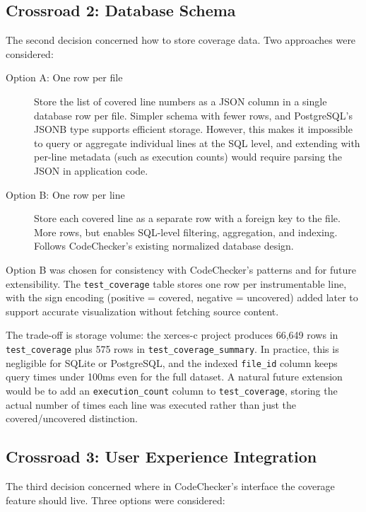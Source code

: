 \subsection{Crossroad 2: Database Schema}

The second decision concerned how to store coverage data. Two approaches were considered:

\begin{description}
    \item[Option A: One row per file] Store the list of covered line numbers as a JSON column in a single database row per file. Simpler schema with fewer rows, and PostgreSQL's JSONB type supports efficient storage. However, this makes it impossible to query or aggregate individual lines at the SQL level, and extending with per-line metadata (such as execution counts) would require parsing the JSON in application code.

    \item[Option B: One row per line] Store each covered line as a separate row with a foreign key to the file. More rows, but enables SQL-level filtering, aggregation, and indexing. Follows CodeChecker's existing normalized database design.
\end{description}

Option B was chosen for consistency with CodeChecker's patterns and for future extensibility. The \texttt{test\_coverage} table stores one row per instrumentable line, with the sign encoding (positive = covered, negative = uncovered) added later to support accurate visualization without fetching source content.

The trade-off is storage volume: the xerces-c project produces 66,649 rows in \texttt{test\_coverage} plus 575 rows in \texttt{test\_coverage\_summary}. In practice, this is negligible for SQLite or PostgreSQL, and the indexed \texttt{file\_id} column keeps query times under 100ms even for the full dataset. A natural future extension would be to add an \texttt{execution\_count} column to \texttt{test\_coverage}, storing the actual number of times each line was executed rather than just the covered/uncovered distinction.

\subsection{Crossroad 3: User Experience Integration}

The third decision concerned where in CodeChecker's interface the coverage feature should live. Three options were considered:

